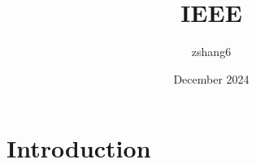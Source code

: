 \documentclass{article}
\title{IEEE}
\author{zshang6 }
\date{December 2024}
\begin{document}
\maketitle

\section{Introduction}
\end{document}
